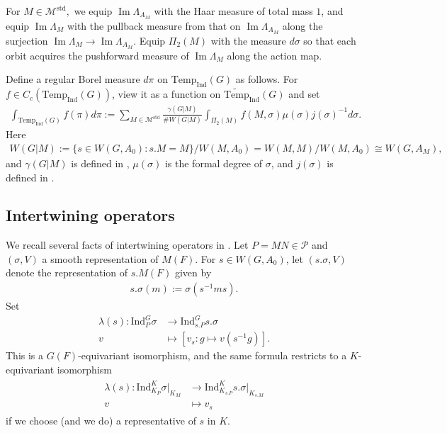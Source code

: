 \documentclass[10pt]{amsart}
\theoremstyle{definition}
\numberwithin{equation}{section}
\numberwithin{equation}{subsection}
\newcommand{\Ind}{\mathrm{Ind}}
\newcommand{\Temp}{\mathrm{Temp}}
\renewcommand{\Im}{\mathop{\mathrm{Im}}}
\begin{document}
For $M\in \mathcal{M}^{\mathrm{std}},$ we equip $\Im\Lambda_{A_M}$ with the Haar measure of total mass $1$, and equip $\Im\Lambda_M$ with the pullback measure from that on $\Im\Lambda_{A_M}$ along the surjection $\Im\Lambda_{M}\to\Im\Lambda_{A_M}$. Equip $\Pi_2(M)$ with the measure $d\sigma$ so that each orbit acquires the pushforward measure of $\Im\Lambda_M$ along the action map. 

Define a regular Borel measure $d\pi$ on $\Temp_\Ind(G)$ as follows. For $f\in C_c(\Temp_\Ind(G))$, view it as a function on $\widetilde{\Temp}_\Ind(G)$ and set
\begin{align*}
    \int_{\Temp_\Ind(G)} f(\pi) d\pi := \sum_{M\in\mathcal{M}^{\mathrm{std}}} \frac{\gamma(G|M)}{\#W(G|M)} \int_{\Pi_2(M)} f(M,\sigma) \mu(\sigma)j(\sigma)^{-1} d\sigma.
\end{align*}
Here 
\begin{align*}
    W(G|M):=\{s\in W(G,A_0):s. M=M\}/W(M,A_0)=W(M,M)/W(M,A_0)\cong W(G,A_M),
\end{align*}
and $\gamma(G|M)$ is defined in \cite[p.241]{Waldspurger:Plancherel}, $\mu(\sigma)$ is the formal degree of $\sigma$, and $j(\sigma)$ is defined in \cite[p.285]{Waldspurger:Plancherel}.

\subsection{Intertwining operators}\label{subsec:intertwining:recall} We recall several facts of intertwining operators in \cite{Waldspurger:Plancherel}. Let $P=MN\in \mathcal{P}$ and $(\sigma,V)$ a smooth representation of $M(F)$. For $s\in W(G,A_0)$, let $(s.\sigma,V)$ denote the representation of $s.M(F)$ given by 
\begin{align*}
    s.\sigma(m) := \sigma(s^{-1}ms).
\end{align*}
Set
\begin{align*}%
\lambda(s):\Ind_{P}^G \sigma &\longrightarrow \Ind_{s.P}^{G} s.\sigma\\
    v&\mapsto [v_s:g\mapsto v(s^{-1}g)].
\end{align*}
This is a $G(F)$-equivariant isomorphism, and the same formula restricts to a $K$-equivariant isomorphism
\begin{align}\label{leftW}
\begin{split}
    \lambda(s):\Ind_{K_P}^K \sigma\vert_{K_M}&\longrightarrow \Ind_{K_{s.P}}^{K} s.\sigma\vert_{K_{s.M}}\\
    v&\mapsto v_s
\end{split}
\end{align}
if we choose (and we do) a representative of $s$ in $K$.
\end{document}
